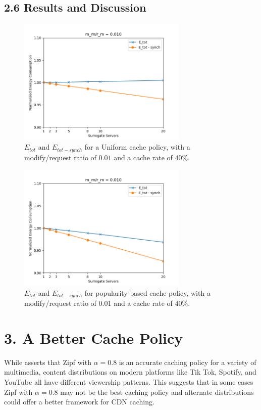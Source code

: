 \documentclass[
	a4paper, %
	10pt, %
	unnumberedsections, %
	twoside, %
]{LTJournalArticle}
\begin{document}
\subsection{2.6 Results and Discussion}
\begin{figure}[!hbt]
	\begin{center}
		\includegraphics[width=8.1cm]{plots/sc40ratio0.01uniform.png}
	\end{center}
	\caption{$E_{tot}$ and $E_{tot - synch}$ for a Uniform cache policy, with a modify/request ratio of $0.01$ and a cache rate of $40\%$.}	
\end{figure}
\begin{figure}[!hbt]
	\begin{center}
		\includegraphics[width=8.1cm]{plots/sc40ratio0.01zipf.png}
	\end{center}
	\caption{$E_{tot}$ and $E_{tot - synch}$ for popularity-based cache policy, with a modify/request ratio of $0.01$ and a cache rate of $40\%$.}	
\end{figure}

\section{3. A Better Cache Policy}

While \cite{biancoCDNs2017} asserts that Zipf with $\alpha = 0.8$ is an accurate caching policy for a variety of multimedia, content distributions on modern platforms like Tik Tok, Spotify, and YouTube all have different viewership patterns. This suggests that in some cases Zipf with $\alpha = 0.8$ may not be the best caching policy and alternate distributions could offer a better framework for CDN caching. 
\end{document}
